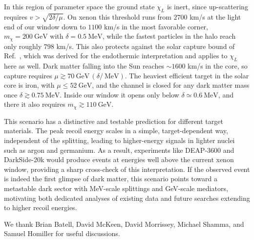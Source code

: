 \documentclass[prd,aps,reprint,superscriptaddress,nofootinbib]{revtex4-2}
\newcommand{\MeV}{~\text{MeV}}
\newcommand{\GeV}{~\text{GeV}}
\begin{document}
In this region of parameter space the ground state $\chi_L$ is inert, since up-scattering requires $v > \sqrt{2\delta/\mu}$. On xenon this threshold runs from $2700$ km/s at the light end of our window down to $1100$ km/s in the most favorable corner, $m_\chi = 200\GeV$ with $\delta = 0.5\MeV$, while the fastest particles in the halo reach only roughly $798$ km/s. This also protects against the solar capture bound of Ref.~\cite{Pospelov:2026ewn}, which was derived for the endothermic interpretation and applies to $\chi_L$ here as well. Dark matter falling into the Sun reaches $\sim 1600$ km/s in the core, so capture requires $\mu \gtrsim 70\GeV\,(\delta/\MeV)$. The heaviest efficient target in the solar core is iron, with $\mu \leq 52\GeV$, and the channel is closed for any dark matter mass once $\delta \gtrsim 0.75\MeV$. Inside our window it opens only below $\delta \simeq 0.6\MeV$, and there it also requires $m_\chi \gtrsim 110\GeV$.

This scenario has a distinctive and testable prediction for different target materials. The peak recoil energy scales in a simple, target-dependent way, independent of the splitting, leading to higher-energy signals in lighter nuclei such as argon and germanium. As a result, experiments like DEAP-3600 and DarkSide-20k would produce events at energies well above the current xenon window, providing a sharp cross-check of this interpretation. If the observed event is indeed the first glimpse of dark matter, this scenario points toward a metastable dark sector with MeV-scale splittings and GeV-scale mediators, motivating both dedicated analyses of existing data and future searches extending to higher recoil energies.










\acknowledgments
We thank Brian Batell, David McKeen, David Morrissey, Michael Shamma, and Samuel Homiller for useful discussions.












\end{document}
